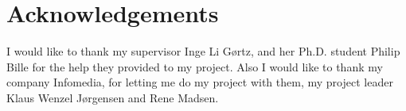 \chapter{Acknowledgements}

I would like to thank my supervisor Inge Li Gørtz, and her Ph.D. student Philip Bille for the help they provided to my project. Also I would like to thank my company Infomedia, for letting me do my project with them, my project leader Klaus Wenzel Jørgensen and Rene Madsen.

